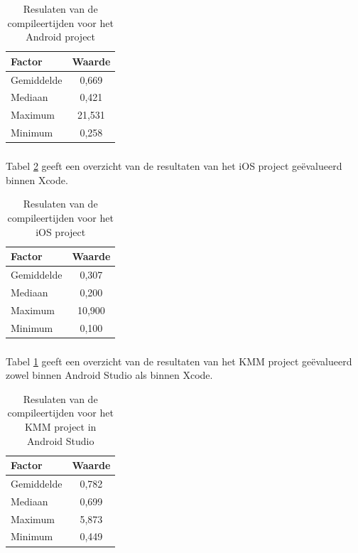 \begin{table}[H]
    \centering
    \caption{Resulaten van de compileertijden voor het Android project}
    \begin{tabular}{|l|c|}
        \hline
        {\textbf{Factor}} & {\textbf{Waarde}} \\ \hline \hline
        Gemiddelde&0,669\\ \hline
        Mediaan&0,421\\ \hline
        Maximum&21,531\\ \hline
        Minimum&0,258\\ \hline
    \end{tabular}
    \label{T:compileer-android}
\end{table}


\subsubsection{}
\label{sec:M-test-compileersnelheid-ios}
Tabel \ref{T:compileer-ios} geeft een overzicht van de resultaten van het iOS project geëvalueerd binnen Xcode.

\begin{table}[H]
    \centering
    \caption{Resulaten van de compileertijden voor het iOS project}
    \begin{tabular}{|l|c|}
        \hline
        {\textbf{Factor}} & {\textbf{Waarde}} \\ \hline \hline
        Gemiddelde&0,307\\ \hline
        Mediaan&0,200\\ \hline
        Maximum&10,900\\ \hline
        Minimum&0,100\\ \hline
    \end{tabular}
    \label{T:compileer-ios}
\end{table}


\subsubsection{}
\label{sec:M-test-compileersnelheid-kmm}
Tabel \ref{T:compileer-android} geeft een overzicht van de resultaten van het KMM project geëvalueerd zowel binnen Android Studio als binnen Xcode.

\begin{table}[H]
    \centering
    \caption{Resulaten van de compileertijden voor het KMM project in Android Studio}
    \begin{tabular}{|l|c|}
        \hline
        {\textbf{Factor}} & {\textbf{Waarde}} \\ \hline \hline
        Gemiddelde&0,782\\ \hline
        Mediaan&0,699\\ \hline
        Maximum&5,873\\ \hline
        Minimum&0,449\\ \hline
    \end{tabular}
    \label{T:compileer-kmm-as}
\end{table}

